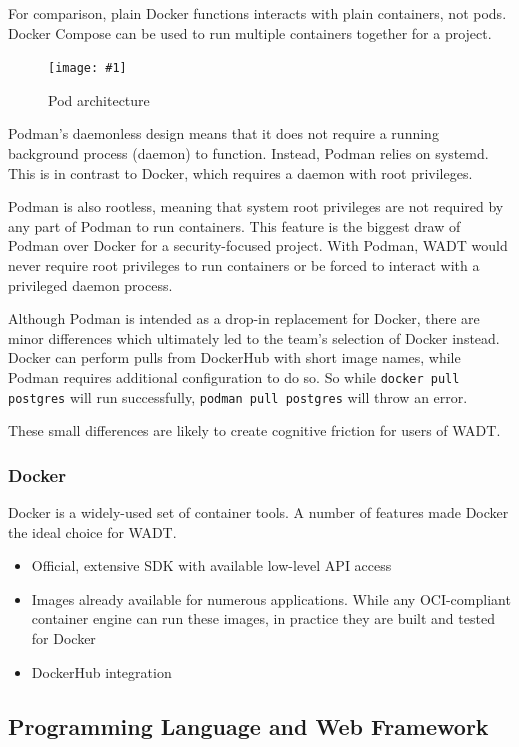 \documentclass[12pt]{article}
\newcommand{\simplegraphic}[3] {
\begin{figure}[H]
	\centering
	\texttt{[image: \#1]}
	\caption{#2}
	\label{#3}
\end{figure}
}
\begin{document}
For comparison, plain Docker functions interacts with plain containers, not pods. Docker Compose can be used to run multiple containers together for a project.

\simplegraphic{podman-pod-architecture}{Pod architecture}{fig:podman}

Podman's daemonless design means that it does not require a running background process (daemon) to function. Instead, Podman relies on systemd. This is in contrast to Docker, which requires a daemon with root privileges.

Podman is also rootless, meaning that system root privileges are not required by any part of Podman to run containers. This feature is the biggest draw of Podman over Docker for a security-focused project. With Podman, WADT would never require root privileges to run containers or be forced to interact with a privileged daemon process.

Although Podman is intended as a drop-in replacement for Docker, there are minor differences which ultimately led to the team's selection of Docker instead. Docker can perform pulls from DockerHub with short image names, while Podman requires additional configuration to do so. So while \texttt{docker pull postgres} will run successfully, \texttt{podman pull postgres} will throw an error.

These small differences are likely to create cognitive friction for users of WADT.


\subsubsection{Docker}
Docker is a widely-used set of container tools. A number of features made Docker the ideal choice for WADT.
\begin{itemize}
	\item Official, extensive SDK with available low-level API access
	\item Images already available for numerous applications. While any OCI-compliant container engine can run these images, in practice they are built and tested for Docker
	\item DockerHub integration
\end{itemize}

\subsection{Programming Language and Web Framework}
\end{document}
